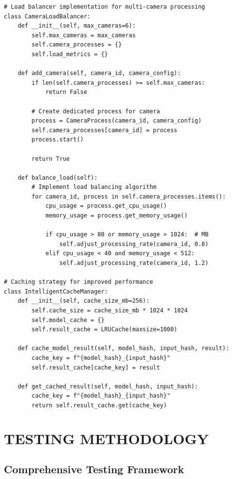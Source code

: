 \documentclass[12pt,a4paper]{article}
\begin{document}
\begin{lstlisting}
# Load balancer implementation for multi-camera processing
class CameraLoadBalancer:
    def __init__(self, max_cameras=6):
        self.max_cameras = max_cameras
        self.camera_processes = {}
        self.load_metrics = {}
    
    def add_camera(self, camera_id, camera_config):
        if len(self.camera_processes) >= self.max_cameras:
            return False
        
        # Create dedicated process for camera
        process = CameraProcess(camera_id, camera_config)
        self.camera_processes[camera_id] = process
        process.start()
        
        return True
    
    def balance_load(self):
        # Implement load balancing algorithm
        for camera_id, process in self.camera_processes.items():
            cpu_usage = process.get_cpu_usage()
            memory_usage = process.get_memory_usage()
            
            if cpu_usage > 80 or memory_usage > 1024:  # MB
                self.adjust_processing_rate(camera_id, 0.8)
            elif cpu_usage < 40 and memory_usage < 512:
                self.adjust_processing_rate(camera_id, 1.2)

# Caching strategy for improved performance
class IntelligentCacheManager:
    def __init__(self, cache_size_mb=256):
        self.cache_size = cache_size_mb * 1024 * 1024
        self.model_cache = {}
        self.result_cache = LRUCache(maxsize=1000)
    
    def cache_model_result(self, model_hash, input_hash, result):
        cache_key = f"{model_hash}_{input_hash}"
        self.result_cache[cache_key] = result
    
    def get_cached_result(self, model_hash, input_hash):
        cache_key = f"{model_hash}_{input_hash}"
        return self.result_cache.get(cache_key)
\end{lstlisting}

\newpage
\section{TESTING METHODOLOGY}

\subsection{Comprehensive Testing Framework}
\end{document}
